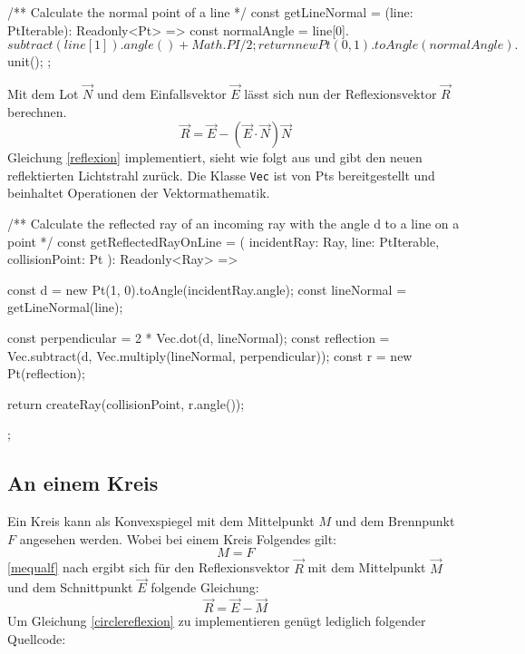 \begin{verbnobox}[\scriptsize\mbox{}]
/** Calculate the normal point of a line */
const getLineNormal = (line: PtIterable): Readonly<Pt> => {
    const normalAngle = line[0].$subtract(line[1]).angle() + Math.PI / 2;
    return new Pt(0, 1).toAngle(normalAngle).$unit();
};
\end{verbnobox}
Mit dem Lot $ \vec{N} $ und dem Einfallsvektor $ \vec{E} $ lässt sich nun der Reflexionsvektor $ \vec{R} $ berechnen. \parencite[vgl.][Kapitel 10]{cross2013raytracing}
\begin{equation}
    \label{reflexion}
    \vec{R} = \vec{E} - (\vec{E} \cdot \vec{N})\vec{N}
\end{equation}
Gleichung \ref{reflexion} implementiert, sieht wie folgt aus und gibt den neuen reflektierten Lichtstrahl zurück. 
Die Klasse \texttt{Vec} ist von Pts bereitgestellt und beinhaltet Operationen der Vektormathematik.

\begin{verbnobox}[\scriptsize\mbox{}]
/** Calculate the reflected ray of an incoming ray with the angle d to a line on a point */
const getReflectedRayOnLine = (
    incidentRay: Ray,
    line: PtIterable,
    collisionPoint: Pt
): Readonly<Ray> => {
    const d = new Pt(1, 0).toAngle(incidentRay.angle);
    const lineNormal = getLineNormal(line);

    const perpendicular = 2 * Vec.dot(d, lineNormal);
    const reflection = Vec.subtract(d, Vec.multiply(lineNormal, perpendicular));
    const r = new Pt(reflection);

    return createRay(collisionPoint, r.angle());
};
\end{verbnobox}

\subsection*{An einem Kreis}
Ein Kreis kann als Konvexspiegel mit dem Mittelpunkt $ M $ und dem Brennpunkt $ F $ angesehen werden. \parencite[vgl.][S. 362]{kuchling2004taschenbuch}
Wobei bei einem Kreis Folgendes gilt: 
\begin{equation}
    \label{mequalf}
    M = F
\end{equation}
\ref{mequalf} nach ergibt sich für den Reflexionsvektor $ \vec{R} $ mit dem Mittelpunkt $ \vec{M} $ und dem Schnittpunkt $ \vec{E} $ folgende Gleichung:
\begin{equation}
    \label{circlereflexion}
    \vec{R} = \vec{E} - \vec{M}
\end{equation}
Um Gleichung \ref{circlereflexion} zu implementieren genügt lediglich folgender Quellcode:

